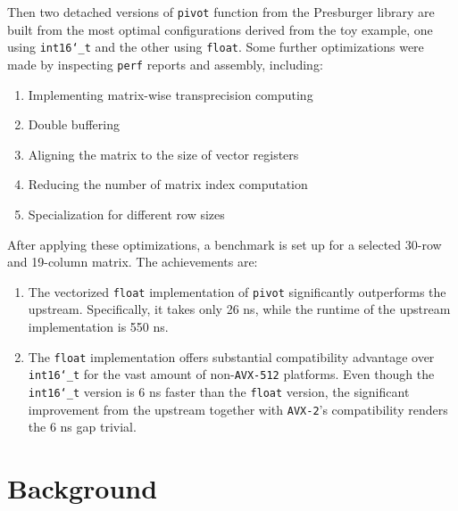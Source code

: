 \documentclass[logo,bsc,singlespacing,parskip]{infthesis}
\newcommand{\dtshort}{\texttt{int16\char`_t}}
\newcommand{\dtfloat}{\texttt{float}}
\newcommand{\pivot}{\texttt{pivot}}
\newenvironment{compactlist}
{ \begin{enumerate}
    \setlength{\itemsep}{0pt}
    \setlength{\parskip}{0pt}
    \setlength{\parsep}{0pt}     
}
{ \end{enumerate} }
\begin{document}
Then two detached versions of \texttt{pivot} function from the Presburger
library are built from the most optimal configurations derived from the toy
example, one using \dtshort{} and the other using \dtfloat{}. Some
further optimizations were made by inspecting \texttt{perf} reports and
assembly, including: 

\begin{compactlist} 
    \item Implementing matrix-wise transprecision computing 
    \item Double buffering
    \item Aligning the matrix to the size of vector registers
    \item Reducing the number of matrix index computation
    \item Specialization for different row sizes
\end{compactlist}

After applying these optimizations, a benchmark is set up for a
selected 30-row and 19-column matrix. The achievements are: 
\begin{enumerate}
    \item The vectorized \dtfloat{} implementation of \pivot{} significantly
    outperforms the upstream. Specifically, it takes only 26 ns, while the
    runtime of the upstream implementation is 550 ns. 
    \item The \dtfloat{} implementation offers substantial compatibility
    advantage over \dtshort{} for the vast amount of non-\texttt{AVX-512}
    platforms. Even though the \dtshort{} version is 6 ns faster than the
    \dtfloat{} version, the significant improvement from the upstream 
    together with \texttt{AVX-2}'s compatibility
    renders the 6 ns gap trivial. 
\end{enumerate}


\chapter{Background}
\end{document}
